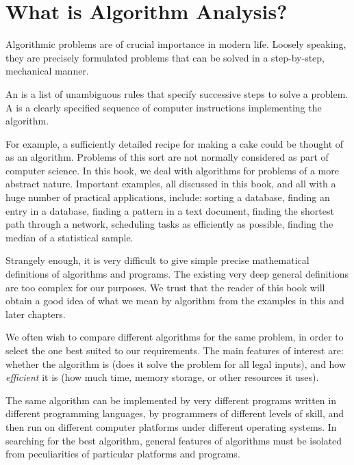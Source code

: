 \chapter{What is Algorithm Analysis?}  
\label{CH:ALG:ANAL}
%
\newcommand{\illustr}[2]{\centerline{\psfig{figure=figs/#1,width=#2}}}
  
Algorithmic problems are of crucial importance in modern life. 
Loosely speaking, they are precisely formulated problems that can be solved in a
step-by-step, mechanical manner. 

\begin{Definition}[informal]
An  is a list of unambiguous rules that specify successive 
steps to solve a problem. A   is a clearly specified 
sequence of computer instructions implementing the algorithm. 
\end{Definition}

For example, a sufficiently detailed recipe for making a cake could
be thought of as an algorithm. Problems of this sort are not normally
considered as part of computer science. In this book, we deal with algorithms 
for problems of a more abstract nature. Important examples, all discussed in this 
book, and all with a huge number of practical applications, include: sorting a 
database, finding an entry in a database, finding a pattern in a text document, 
finding the shortest path through a network, scheduling tasks as efficiently as 
possible, finding the median of a statistical sample.

Strangely enough, it is very difficult to give simple precise mathematical
definitions of algorithms and programs. The existing very deep general
definitions are too complex for our purposes. We trust that the reader
of this book will obtain a good idea of what we mean by algorithm from
the examples in this and later chapters.

We often wish to compare different algorithms for the same problem,
in order to select the one best suited to our requirements. The main
features of interest are: whether the algorithm is 
(does it solve the problem for all legal inputs), and how \emph{efficient} it 
is (how much time, memory storage, or other resources it uses).

The same algorithm can be implemented by very different programs written
in different programming languages, by programmers of different levels of skill,
and then run on different computer platforms under different operating systems.
In searching for the best algorithm, general features of algorithms must be 
isolated from peculiarities of particular platforms and programs. 


